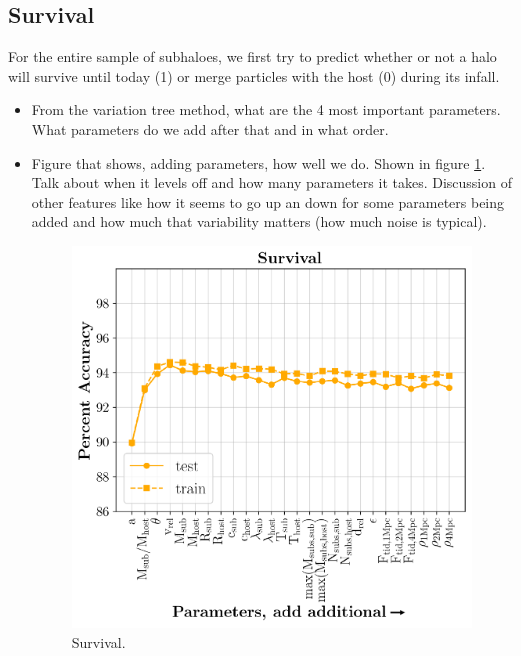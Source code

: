 \documentclass[fleqn,usenatbib]{mnras}
\begin{document}
\subsection{Survival}
\label{sec:survival} %

For the entire sample of subhaloes, we first try to predict whether or not a halo will survive until today (1) or merge particles with the host (0) during its infall.
\begin{itemize}
	\item From the variation tree method, what are the 4 most important parameters. What parameters do we add after that and in what order.
	\item Figure that shows, adding parameters, how well we do. Shown in figure \ref{fig:survival_predictions}. Talk about when it levels off and how many parameters it takes. Discussion of other features like how it seems to go up an down for some parameters being added and how much that variability matters (how much noise is typical).
	\begin{figure}
	\includegraphics[width=\columnwidth]{Figures/survival_predictions}
    \caption{Survival.}
    \label{fig:survival_predictions}
\end{figure}

\end{itemize}
\end{document}
